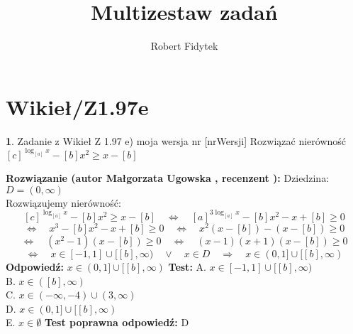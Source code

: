 \documentclass[12pt, a4paper]{article}
\title{Multizestaw zadań}
\author{Robert Fidytek}
\date{}
\theoremstyle{definition} %
\newtheorem{zad}{}
\newcommand{\kategoria}[1]{\section{#1}} %
\newcommand{\zadStart}[1]{\begin{zad}#1\newline} %
\newcommand{\zadStop}{\end{zad}}   %
\newcommand{\rozwStart}[2]{\noindent \textbf{Rozwiązanie (autor #1 , recenzent #2): }\newline} %
\newcommand{\rozwStop}{\newline}                                            %
\newcommand{\odpStart}{\noindent \textbf{Odpowiedź:}\newline}    %
\newcommand{\odpStop}{\newline}                                             %
\newcommand{\testStart}{\noindent \textbf{Test:}\newline} %
\newcommand{\testStop}{\newline} %
\newcommand{\kluczStart}{\noindent \textbf{Test poprawna odpowiedź:}\newline} %
\newcommand{\kluczStop}{\newline} %
\begin{document}
\maketitle


\kategoria{Wikieł/Z1.97e}
\zadStart{Zadanie z Wikieł Z 1.97 e) moja wersja nr [nrWersji]}
Rozwiązać nierówno\'sć $[c]^{\log_{[a]}{x}}-[b]x^2 \ge x -[b]$
\zadStop
\rozwStart{Małgorzata Ugowska}{}
Dziedzina: $D = (0, \infty)$\\
Rozwiązujemy nierówno\'sć:
$$[c]^{\log_{[a]}{x}}-[b]x^2 \ge x -[b] \quad \Longleftrightarrow \quad [a]^{3\log_{[a]}{x}}-[b]x^2 -x+[b] \ge 0 $$
$$\Longleftrightarrow \quad x^3 -[b]x^2 -x+[b] \ge 0  \quad \Longleftrightarrow \quad x^2(x-[b]) -(x-[b]) \ge 0 $$
$$ \Longleftrightarrow \quad (x^2-1)(x-[b]) \ge 0 \quad \Longleftrightarrow \quad  (x-1)(x+1)(x-[b]) \ge 0 $$
$$ \Longleftrightarrow \quad x \in [-1, 1] \cup [[b], \infty) \quad \vee \quad x \in D \quad \Longrightarrow \quad x \in (0, 1] \cup [[b], \infty)$$
\rozwStop
\odpStart
$x \in (0, 1] \cup [[b], \infty)$
\odpStop
\testStart
A. $x \in [-1, 1] \cup [[b], \infty)$\\
B. $x \in ([b], \infty)$\\
C. $x \in (-\infty, -4) \cup (3,\infty)$\\
D. $x \in (0, 1] \cup [[b], \infty)$\\
E. $x \in \emptyset$
\testStop
\kluczStart
D
\kluczStop
\end{document}
